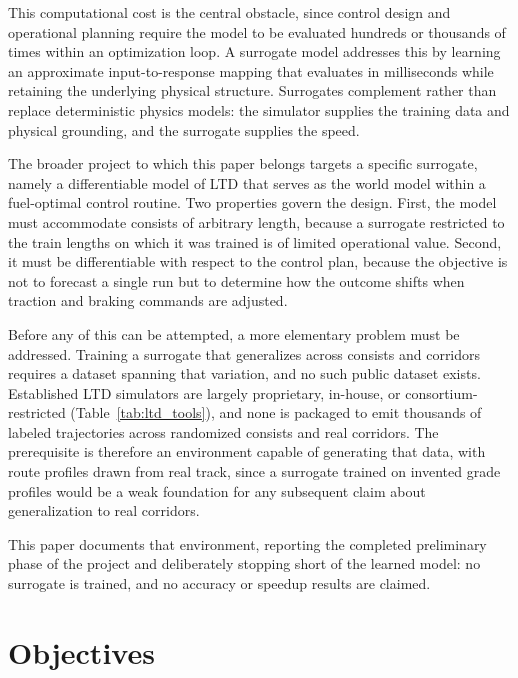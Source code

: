 \documentclass[numbered]{trbunofficial}
\begin{document}
This computational cost is the central obstacle, since control design and operational planning require the model to be evaluated hundreds or thousands of times within an optimization loop. A surrogate model addresses this by learning an approximate input-to-response mapping that evaluates in milliseconds while retaining the underlying physical structure. Surrogates complement rather than replace deterministic physics models: the simulator supplies the training data and physical grounding, and the surrogate supplies the speed.

The broader project to which this paper belongs targets a specific surrogate, namely a differentiable model of LTD that serves as the world model within a fuel-optimal control routine. Two properties govern the design. First, the model must accommodate consists of arbitrary length, because a surrogate restricted to the train lengths on which it was trained is of limited operational value. Second, it must be differentiable with respect to the control plan, because the objective is not to forecast a single run but to determine how the outcome shifts when traction and braking commands are adjusted.

Before any of this can be attempted, a more elementary problem must be addressed. Training a surrogate that generalizes across consists and corridors requires a dataset spanning that variation, and no such public dataset exists. Established LTD simulators are largely proprietary, in-house, or consortium-restricted (Table~\ref{tab:ltd_tools}), and none is packaged to emit thousands of labeled trajectories across randomized consists and real corridors. The prerequisite is therefore an environment capable of generating that data, with route profiles drawn from real track, since a surrogate trained on invented grade profiles would be a weak foundation for any subsequent claim about generalization to real corridors.

This paper documents that environment, reporting the completed preliminary phase of the project and deliberately stopping short of the learned model: no surrogate is trained, and no accuracy or speedup results are claimed.

\section{Objectives}\label{sec:objectives}
\end{document}
